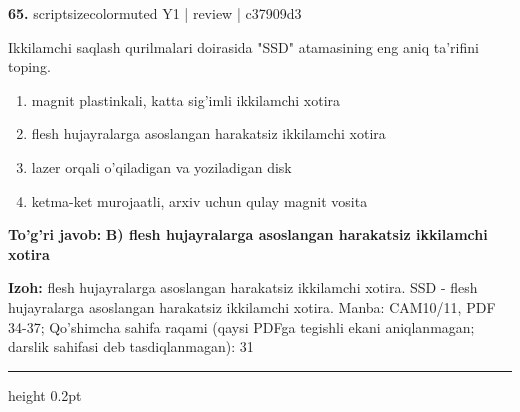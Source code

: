 \documentclass[10pt,a4paper]{article}
\begin{document}
{\bfseries\sffamily\color{ink} 65.} {scriptsizecolor{muted} Y1 | review | c37909d3}
\par
Ikkilamchi saqlash qurilmalari doirasida "SSD" atamasining eng aniq ta'rifini toping.
\begin{enumerate}[label=\Alph*),leftmargin=9mm]
\item magnit plastinkali, katta sig'imli ikkilamchi xotira
\item flesh hujayralarga asoslangan harakatsiz ikkilamchi xotira
\item lazer orqali o'qiladigan va yoziladigan disk
\item ketma-ket murojaatli, arxiv uchun qulay magnit vosita
\end{enumerate}
\begin{tcolorbox}[enhanced,breakable,colback=teal!4,colframe=teal!60!black,boxrule=0.45pt,arc=1.2mm,left=2.7mm,right=2.7mm,top=1.8mm,bottom=1.8mm,before skip=2mm,after skip=2mm]
{\bfseries\sffamily\color{teal}To'g'ri javob:} \textbf{B) flesh hujayralarga asoslangan harakatsiz ikkilamchi xotira}
\par\smallskip
{\bfseries Izoh:} flesh hujayralarga asoslangan harakatsiz ikkilamchi xotira. SSD - flesh hujayralarga asoslangan harakatsiz ikkilamchi xotira. Manba: CAM10/11, PDF 34-37; Qo'shimcha sahifa raqami (qaysi PDFga tegishli ekani aniqlanmagan; darslik sahifasi deb tasdiqlanmagan): 31
\end{tcolorbox}
\vspace{2mm}\hrule height 0.2pt\vspace{3mm}
\end{document}
